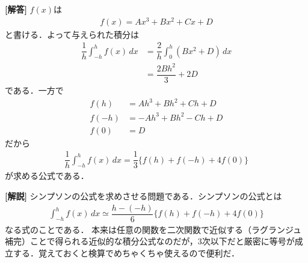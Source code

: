 \documentclass[../../main.tex]{subfiles}
\begin{document}
\begin{oframed}
  
\end{oframed}

{\bf [解答]}
$f(x)$は
\begin{align}
  f(x) = Ax^3+Bx^2+Cx+D
\end{align}
と書ける．よって与えられた積分は
\begin{align}
  \dfrac{1}{h} \int_{-h}^{h} f(x) \, dx
  &= \dfrac{2}{h} \int_{0}^{h} \left(Bx^2+D\right) \, dx \\
  &= \dfrac{2Bh^2}{3} + 2D
\end{align}
である．一方で
\begin{align}
  f(h)  &=  Ah^3+Bh^2+Ch+D\\
  f(-h) &= -Ah^3+Bh^2-Ch+D\\
  f(0)  &= D
\end{align}
だから
\begin{align}
  \dfrac{1}{h} \int_{-h}^{h} f(x) \, dx = \dfrac{1}{3} \{ f(h) + f(-h) + 4f(0) \}
\end{align}
が求める公式である．

{\bf [解説]}
シンプソンの公式を求めさせる問題である．シンプソンの公式とは
\begin{align}
  \int_{-h}^{h} f(x) \, dx \simeq \dfrac{h - (-h)}{6} \{ f(h) + f(-h) + 4f(0) \}
\end{align}
なる式のことである．
本来は任意の関数を二次関数で近似する（ラグランジュ補完）ことで得られる近似的な積分公式なのだが，$3$次以下だと厳密に等号が成立する．覚えておくと検算でめちゃくちゃ使えるので便利だ．
\end{document}
